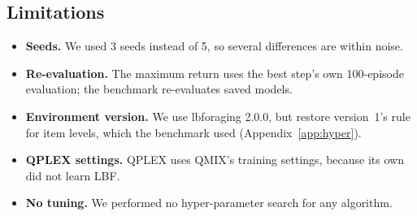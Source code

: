 \subsection{Limitations}
\begin{itemize}
  \item \textbf{Seeds.} We used 3 seeds instead of 5, so several differences are within noise.
  \item \textbf{Re-evaluation.} The maximum return uses the best step's own 100-episode
        evaluation; the benchmark re-evaluates saved models.
  \item \textbf{Environment version.} We use lbforaging 2.0.0, but restore version~1's rule for
        item levels, which the benchmark used (Appendix~\ref{app:hyper}).
  \item \textbf{QPLEX settings.} QPLEX uses QMIX's training settings, because its own did not
        learn LBF.
  \item \textbf{No tuning.} We performed no hyper-parameter search for any algorithm.
\end{itemize}
